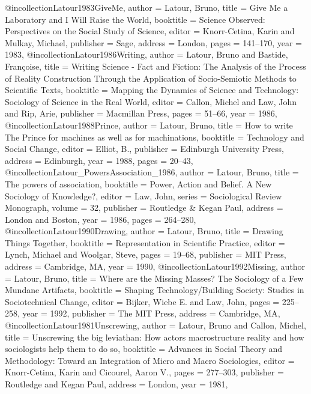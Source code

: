 @incollection{Latour1983GiveMe,
  author    = {Latour, Bruno},
  title     = {{Give Me a Laboratory and I Will Raise the World}},
  booktitle = {{Science Observed: Perspectives on the Social Study of Science}},
  editor    = {Knorr-Cetina, Karin and Mulkay, Michael},
  publisher = {Sage},
  address   = {London},
  pages     = {141--170},
  year      = {1983},
}
@incollection{Latour1986Writing,
  author    = {Latour, Bruno and Bastide, Françoise},
  title     = {{Writing Science - Fact and Fiction: The Analysis of the Process of Reality Construction Through the Application of Socio-Semiotic Methods to Scientific Texts}},
  booktitle = {{Mapping the Dynamics of Science and Technology: Sociology of Science in the Real World}},
  editor    = {Callon, Michel and Law, John and Rip, Arie},
  publisher = {Macmillan Press},
  pages     = {51--66},
  year      = {1986},
}
@incollection{Latour1988Prince,
  author    = {Latour, Bruno},
  title     = {{How to write The Prince for machines as well as for machinations}},
  booktitle = {{Technology and Social Change}},
  editor    = {Elliot, B.},
  publisher = {Edinburgh University Press},
  address   = {Edinburgh},
  year      = {1988},
  pages     = {20--43},
}
@incollection{Latour_PowersAssociation_1986,
  author    = {Latour, Bruno},
  title     = {The powers of association},
  booktitle = {Power, Action and Belief. A New Sociology of Knowledge?},
  editor    = {Law, John},
  series    = {Sociological Review Monograph},
  volume    = {32},
  publisher = {Routledge \& Kegan Paul},
  address   = {London and Boston},
  year      = {1986},
  pages     = {264--280},
}
@incollection{Latour1990Drawing,
  author    = {Latour, Bruno},
  title     = {{Drawing Things Together}},
  booktitle = {{Representation in Scientific Practice}},
  editor    = {Lynch, Michael and Woolgar, Steve},
  pages     = {19--68},
  publisher = {MIT Press},
  address   = {Cambridge, MA},
  year      = {1990},
}
@incollection{Latour1992Missing,
  author    = {Latour, Bruno},
  title     = {{Where are the Missing Masses? The Sociology of a Few Mundane Artifacts}},
  booktitle = {{Shaping Technology/Building Society: Studies in Sociotechnical Change}},
  editor    = {Bijker, Wiebe E. and Law, John},
  pages     = {225--258},
  year      = {1992},
  publisher = {The MIT Press},
  address   = {Cambridge, MA},
}
@incollection{Latour1981Unscrewing,
  author    = {Latour, Bruno and Callon, Michel},
  title     = {{Unscrewing the big leviathan: How actors macrostructure reality and how sociologists help them to do so}},
  booktitle = {{Advances in Social Theory and Methodology: Toward an Integration of Micro and Macro Sociologies}},
  editor    = {Knorr-Cetina, Karin and Cicourel, Aaron V.},
  pages     = {277--303},
  publisher = {Routledge and Kegan Paul},
  address   = {London},
  year      = {1981},
}
